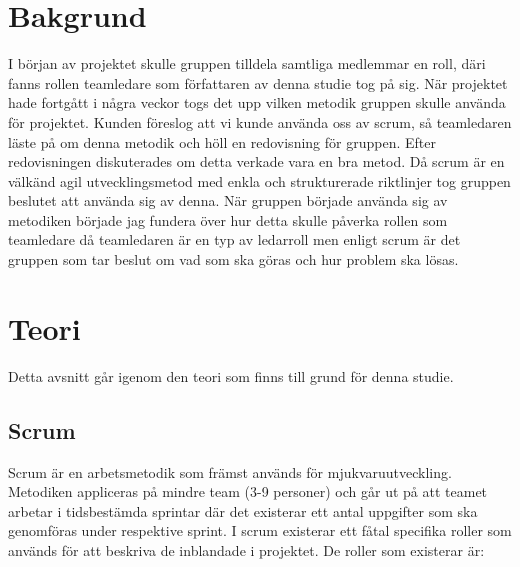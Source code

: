 \section{Bakgrund}
I början av projektet skulle gruppen tilldela samtliga medlemmar en roll, däri fanns rollen teamledare som författaren av denna studie tog på sig. När projektet hade fortgått i några veckor togs det upp vilken metodik gruppen skulle använda för projektet. Kunden föreslog att vi kunde använda oss av scrum, så teamledaren läste på om denna metodik och höll en redovisning för gruppen. Efter redovisningen diskuterades om detta verkade vara en bra metod. Då scrum är en välkänd agil utvecklingsmetod med enkla och strukturerade riktlinjer tog gruppen beslutet att använda sig av denna. När gruppen började använda sig av metodiken började jag fundera över hur detta skulle påverka rollen som teamledare då teamledaren är en typ av ledarroll men enligt scrum är det gruppen som tar beslut om vad som ska göras och hur problem ska lösas.

\section{Teori}
Detta avsnitt går igenom den teori som finns till grund för denna studie.

\subsection{Scrum} \label{adam_scrum}
Scrum är en arbetsmetodik som främst används för mjukvaruutveckling. Metodiken appliceras på mindre team (3-9 personer) och går ut på att teamet arbetar i tidsbestämda sprintar där det existerar ett antal uppgifter som ska genomföras under respektive sprint.
I scrum existerar ett fåtal specifika roller som används för att beskriva de inblandade i projektet. De roller som existerar är:

